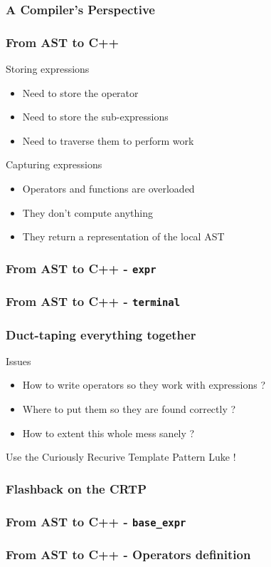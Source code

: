 \begin{frame}
\frametitle{A Compiler's Perspective}
\begin{center}\end{center}
\end{frame}

\begin{frame}
\frametitle{From AST to C++}
\begin{block}{Storing expressions}
\begin{itemize}
\item Need to store the \alert{operator}
\item Need to store the \alert{sub-expressions}
\item Need to traverse them to perform work
\end{itemize}
\end{block}{}

\begin{block}{Capturing expressions}
\begin{itemize}
\item Operators and functions are overloaded
\item They don't compute anything
\item They return a \alert{representation} of the local AST
\end{itemize}
\end{block}{}
\end{frame}

\begin{frame}
\frametitle{From AST to C++ - \texttt{expr}}
\end{frame}

\begin{frame}
\frametitle{From AST to C++ - \texttt{terminal}}
\lstterminal
\end{frame}

\begin{frame}
\frametitle{Duct-taping everything together}
\begin{block}{Issues}
\begin{itemize}
\item How to write operators so they work with expressions ?
\item Where to put them so they are found correctly ?
\item How to extent this whole mess sanely ?
\end{itemize}
\end{block}{}

{
\begin{center}
Use the \alert{Curiously Recurive Template Pattern} Luke !
\end{center}
}
\end{frame}

\begin{frame}
\frametitle{Flashback on the CRTP}
\lstcrtp
\end{frame}

\begin{frame}
\frametitle{From AST to C++ - \texttt{base\_expr}}
\lstcrtpexpr
\end{frame}

\begin{frame}
\frametitle{From AST to C++ - Operators definition}
\lstcrtpop
\end{frame}

